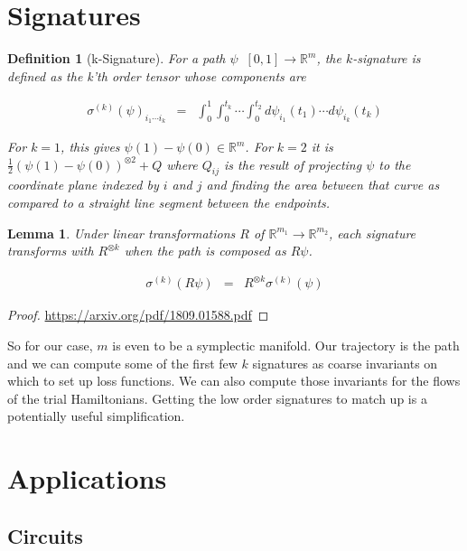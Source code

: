 \documentclass[a4paper,landscape]{article}
\theoremstyle{change}
\newtheorem{definition}[equation]{Definition}
\newtheorem{lemma}[equation]{Lemma}
\theoremstyle{nonumberplain}
\newtheorem{proof}{Proof}
\numberwithin{equation}{section}
\begin{document}
\section{Signatures}

\begin{definition}[k-Signature]
For a path $\psi \; \; [0,1] \to \mathbb{R}^m$, the $k$-signature is defined as the k'th order tensor whose components are

\begin{eqnarray*}
\sigma^{(k)} (\psi)_{i_1 \cdots i_k} &=& \int_0^1 \int_0^{t_k} \cdots \int_0^{t_2} d\psi_{i_1} (t_1) \cdots d\psi_{i_k} (t_k)
\end{eqnarray*}

For $k=1$, this gives $\psi(1)-\psi(0) \in \mathbb{R}^m$. For $k=2$ it is $\frac{1}{2} (\psi (1) - \psi(0) )^{\otimes 2} + Q$ where $Q_{ij}$ is the result of projecting $\psi$ to the coordinate plane indexed by $i$ and $j$ and finding the area between that curve as compared to a straight line segment between the endpoints.

\end{definition}

\begin{lemma}
Under linear transformations $R$ of $\mathbb{R}^{m_1} \to \mathbb{R}^{m_2}$, each signature transforms with $R^{\otimes k}$ when the path is composed as $R \psi$.

\begin{eqnarray*}
\sigma^{(k)} (R \psi ) &=& R^{\otimes k} \sigma^{(k)} (\psi )
\end{eqnarray*}

\end{lemma}

\begin{proof}
\url{https://arxiv.org/pdf/1809.01588.pdf}
\end{proof}

So for our case, $m$ is even to be a symplectic manifold. Our trajectory is the path and we can compute some of the first few $k$ signatures as coarse invariants on which to set up loss functions. We can also compute those invariants for the flows of the trial Hamiltonians. Getting the low order signatures to match up is a potentially useful simplification.

\section{Applications}

\subsection{Circuits}
\end{document}
